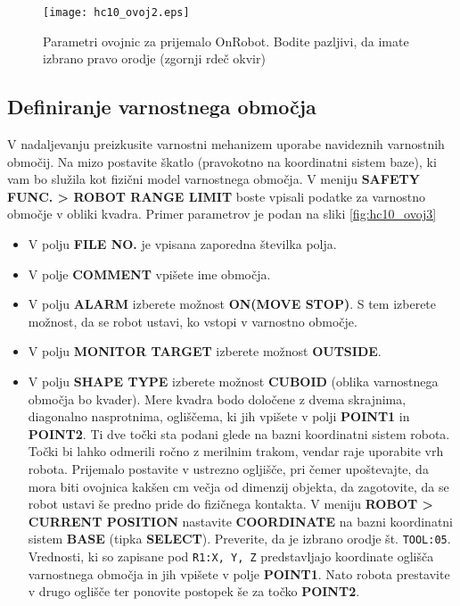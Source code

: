 \begin{figure}[!hbt]
	\centering
	\texttt{[image: hc10\_ovoj2.eps]}
	\caption{Parametri ovojnic za prijemalo OnRobot. Bodite pazljivi, da imate izbrano pravo orodje (zgornji rdeč okvir)}
	\label{fig:hc10_ovoj2}
\end{figure}

\subsection*{Definiranje varnostnega območja}

V nadaljevanju preizkusite varnostni mehanizem uporabe navideznih varnostnih območij. Na mizo postavite škatlo (pravokotno na koordinatni sistem baze), ki vam bo služila kot fizični model varnostnega območja. V meniju \textbf{SAFETY FUNC. > ROBOT RANGE LIMIT} boste vpisali podatke za varnostno območje v obliki kvadra. Primer parametrov je podan na sliki \ref{fig:hc10_ovoj3}
\begin{itemize}
	\item V polju \textbf{FILE NO.} je vpisana zaporedna številka polja.
	\item V polje \textbf{COMMENT} vpišete ime območja.
	\item V polju \textbf{ALARM} izberete možnost \textbf{ON(MOVE STOP)}. S tem izberete možnost, da se robot ustavi, ko vstopi v varnostno območje.
	\item V polju \textbf{MONITOR TARGET} izberete možnost \textbf{OUTSIDE}.
	\item V polju \textbf{SHAPE TYPE} izberete možnost \textbf{CUBOID} (oblika varnostnega območja bo kvader). Mere kvadra bodo določene z dvema skrajnima, diagonalno nasprotnima,  ogliščema, ki jih vpišete v polji  \textbf{POINT1} in \textbf{POINT2}. Ti dve točki sta podani glede na bazni koordinatni sistem robota. Točki bi lahko odmerili ročno z merilnim trakom, vendar raje uporabite vrh robota. Prijemalo postavite v ustrezno ogljišče, pri čemer upoštevajte, da mora biti ovojnica kakšen cm večja od dimenzij objekta, da zagotovite, da se robot ustavi še predno pride do fizičnega kontakta. V meniju \textbf{ROBOT > CURRENT POSITION} nastavite \textbf{COORDINATE} na bazni koordinatni sistem \textbf{BASE} (tipka \textbf{SELECT}). Preverite, da je izbrano orodje št. \verb"TOOL:05". Vrednosti, ki so zapisane pod \verb"R1:X, Y, Z" predstavljajo koordinate oglišča varnostnega območja in jih vpišete v polje \textbf{POINT1}. Nato robota prestavite v drugo oglišče ter ponovite postopek še za točko \textbf{POINT2}.
\end{itemize}


